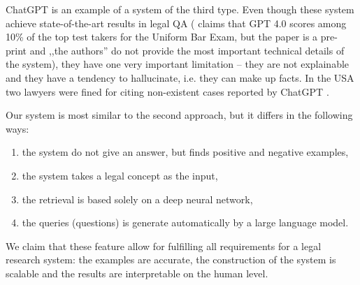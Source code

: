ChatGPT \cite{chung2022scaling} is an example of a system of the third type. Even though these system achieve 
state-of-the-art results in legal QA (\cite{openai2023gpt4} claims that GPT 4.0 scores among 10\% of the top test takers 
for the Uniform Bar Exam, but the paper is a pre-print and ,,the authors'' do not provide the most important technical details
of the system), they have one very important limitation -- they are not explainable and they have a 
tendency to hallucinate, i.e. they can make up facts. In the USA two lawyers were fined for citing non-existent cases
reported by ChatGPT \cite{ap2023lawyers}.

Our system is most similar to the second approach, but it differs in the following ways:
\begin{enumerate}
    \item the system do not give an answer, but finds positive and negative examples,
    \item the system takes a legal concept as the input,
    \item the retrieval is based solely on a deep neural network,
    \item the queries (questions) is generate automatically by a large language model.
\end{enumerate}
We claim that these feature allow for fulfilling all requirements for a legal research system: the examples are accurate,
the construction of the system is scalable and the results are interpretable on the human level.

%

